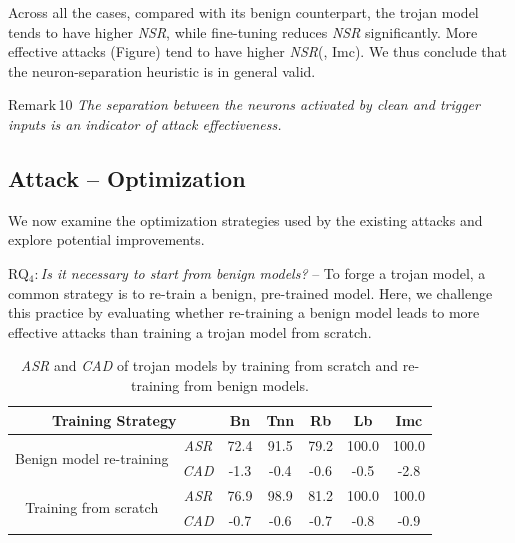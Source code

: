 \documentclass[compsoc,conference,a4paper,10pt,times]{IEEEtran}
\newcommand{\bn}{{\sc Bn}\xspace}
\newcommand{\tnn}{{\sc Tnn}\xspace}
\newcommand{\lb}{{\sc Lb}\xspace}
\newcommand{\rfb}{{\sc Rb}\xspace}
\newcommand{\imc}{{\sc Imc}\xspace}
\newcommand{\asr}{{\em \small ASR}\xspace}
\newcommand{\cad}{{\em \small CAD}\xspace}
\newcommand{\nsr}{{\em \small NSR}\xspace}
\begin{document}
Across all the cases, compared with its benign counterpart, the trojan model tends to have higher \nsr, while fine-tuning reduces \nsr significantly. More effective attacks (\mcf Figure) tend to have higher \nsr (\meg, \imc). We thus conclude that the neuron-separation heuristic is in general valid. 

\begin{mtbox}{\small Remark\,10}
    {\em \small The separation between the neurons activated by clean and trigger inputs is an indicator of attack effectiveness.}
\end{mtbox}
    

\subsection{Attack -- Optimization}

We now examine the optimization strategies used by the existing attacks and explore potential improvements.

\vspace{2pt}
{RQ$_4$:\,{\em Is it necessary to start from benign models?}} -- To forge a trojan model, a common strategy is to re-train a benign, pre-trained model. Here, we challenge this practice by evaluating whether re-training a benign model leads to more effective attacks than training a trojan model from scratch.

\begin{table}[!ht]{\footnotesize
\centering
\renewcommand{\arraystretch}{1.2}
\setlength{\tabcolsep}{3pt}
\begin{tabular}{c|c|c|c|c|c|c}
\multicolumn{2}{c|}{Training Strategy} & \bn & \tnn & \rfb & \lb & \imc \\
\hline
\hline
\multirow{2}{*}{Benign model re-training} & \asr & 72.4 & 91.5 & 79.2 & 100.0 & 100.0 \\
& \cad & -1.3 & -0.4 & -0.6 & -0.5 & -2.8 \\
\hline
\multirow{2}{*}{Training from scratch} & \asr & 76.9 & 98.9 & 81.2 & 100.0  & 100.0 \\
& \cad & -0.7 & -0.6 & -0.7 & -0.8 & -0.9 \\
\end{tabular}
\caption{\asr and \cad of trojan models by training from scratch and re-training from benign models. \label{tab:scratch}}}
\end{table}
\end{document}
